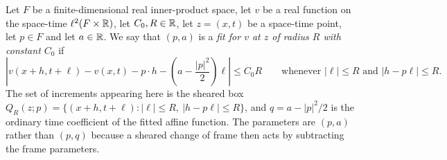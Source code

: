 \begin{definition}
Let $F$ be a finite-dimensional real inner-product space, let $v$ be a real
function on the space-time $\ell^2(F\times\mathbb{R})$, let $C_0,R\in\mathbb{R}$, let
$z=(x,t)$ be a space-time point, let $p\in F$ and let $a\in\mathbb{R}$. We say that
$(p,a)$ is a \emph{fit for $v$ at $z$ of radius $R$ with constant $C_0$} if
\[
  \left|v(x+h,t+\ell)-v(x,t)-p\cdot h
       -\left(a-\frac{|p|^2}{2}\right)\ell\right|\le C_0R
  \qquad\text{whenever }|\ell|\le R\text{ and }|h-p\ell|\le R .
\]
The set of increments appearing here is the sheared box
$Q_R(z;p)=\{(x+h,t+\ell):|\ell|\le R,\ |h-p\ell|\le R\}$, and $q=a-|p|^2/2$ is
the ordinary time coefficient of the fitted affine function. The parameters are
$(p,a)$ rather than $(p,q)$ because a sheared change of frame then acts by
subtracting the frame parameters.
\end{definition}
